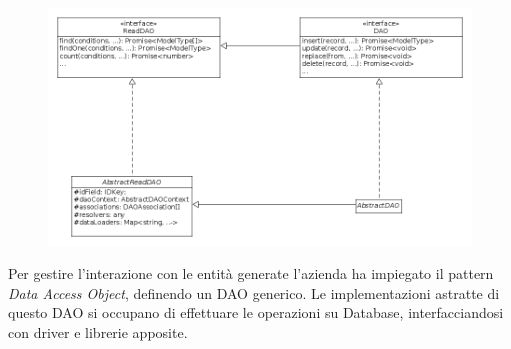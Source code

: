 \documentclass[c]{beamer}
\begin{document}
            \begin{frame}
                \begin{figure}
                    \includegraphics[scale=0.26]{../prototype-architecture.png}
                \end{figure}
                Per gestire l'interazione con le entità generate l'azienda ha impiegato il pattern \emph{Data Access Object}, definendo un DAO generico.
                \vfill
                Le implementazioni astratte di questo DAO si occupano di effettuare le operazioni su Database, interfacciandosi con driver e librerie apposite.
            \end{frame}
\end{document}
